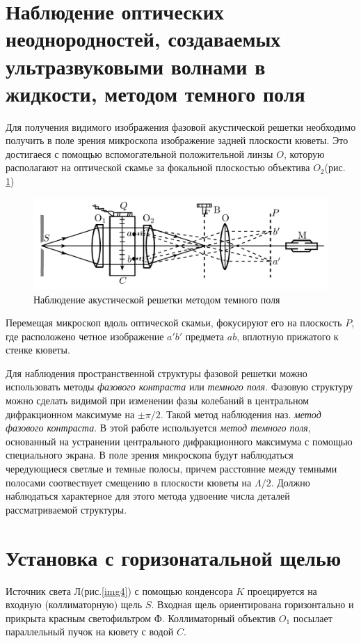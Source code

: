 \documentclass[a4paper,12pt]{article}
\begin{document}
\section{Наблюдение оптических неоднородностей, создаваемых ультразвуковыми волнами в жидкости, методом темного поля}
Для получения видимого изображения фазовой акустической решетки необходимо получить в поле зрения микроскопа изображение задней плоскости кюветы. Это достигаеся с помощью вспомогательной положительной линзы $O$, которую располагают на оптической скамье за фокальной плоскостью объектива $O_2$(рис. \ref{img3})

\begin{figure}[h]
\centering
\includegraphics[width=0.8\linewidth]{img3.png}
\caption{Наблюдение акустической решетки методом темного поля}
\label{img3}
\end{figure}

Перемещая микроскоп вдоль оптической скамьи, фокусируют его на плоскость $P$, где расположено четное изображение $a'b'$ предмета $ab$, вплотную прижатого к стенке кюветы.

Для наблюдения пространственной структуры фазовой решетки можно использовать методы \textit{фазового контраста} или \textit{темного поля}. Фазовую структуру можно сделать видимой при изменении фазы колебаний в центральном дифракционном максимуме на $\pm\pi/2$. Такой метод наблюдения наз. \textit{метод фазового контраста}. В этой работе используется \textit{метод темного поля}, основанный на устранении центрального дифракционного максимума с помощью специального экрана. В поле зрения микроскопа будут наблюдаться чередующиеся светлые и темные полосы, причем расстояние между темными полосами соотвествует смещению в плоскости кюветы на $\Lambda/2$. Должно наблюдаться характерное для этого метода удвоение числа деталей рассматриваемой структуры.

\section{Установка с горизонатальной щелью}
Источник света $\text{Л}$(рис.\ref{img4}) с помощью конденсора $K$ проецируется на входную (коллиматорную) щель $S$. Входная щель ориентирована горизонтально и прикрыта красным светофильтром $\text{Ф}$. Коллиматорный объектив $O_1$ посылает параллельный пучок на кювету с водой $C$.
\end{document}
